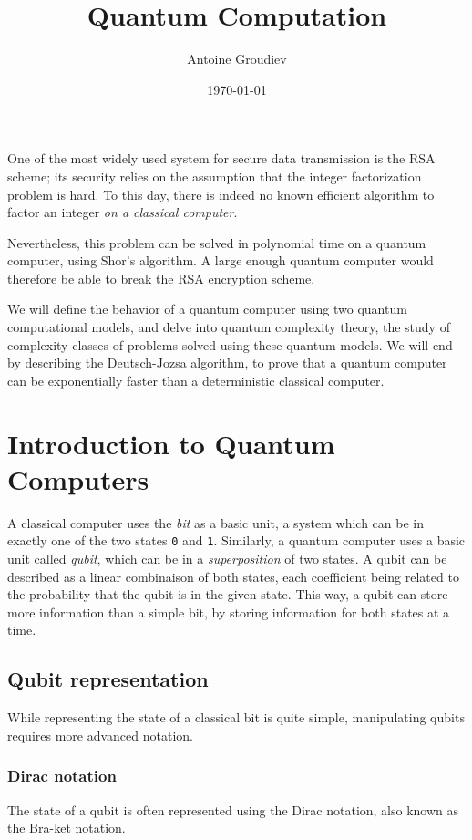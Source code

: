 \documentclass[12pt,a4paper]{article}
\title{\vspace{-3ex} \textbf{Quantum Computation}}
\author{Antoine Groudiev}
\date{\vspace{-1ex}\today}
\begin{document}
\maketitle
One of the most widely used system for secure data transmission is the RSA scheme; its security relies on the assumption that the integer factorization problem is hard. To this day, there is indeed no known efficient algorithm to factor an integer \textit{on a classical computer}.

Nevertheless, this problem can be solved in polynomial time on a quantum computer, using Shor's algorithm. A large enough quantum computer would therefore be able to break the RSA encryption scheme.

We will define the behavior of a quantum computer using two quantum computational models, and delve into quantum complexity theory, the study of complexity classes of problems solved using these quantum models. We will end by describing the Deutsch-Jozsa algorithm, to prove that a quantum computer can be exponentially faster than a deterministic classical computer.

\tableofcontents

\section{Introduction to Quantum Computers}
A classical computer uses the \emph{bit} as a basic unit, a system which can be in exactly one of the two states \texttt{0} and \texttt{1}. Similarly, a quantum computer uses a basic unit called \emph{qubit}, which can be in a \emph{superposition} of two states. A qubit can be described as a linear combinaison of both states, each coefficient being related to the probability that the qubit is in the given state. This way, a qubit can store more information than a simple bit, by storing information for both states at a time.

\subsection{Qubit representation}
While representing the state of a classical bit is quite simple, manipulating qubits requires more advanced notation. 

\subsubsection{Dirac notation}
The state of a qubit is often represented using the Dirac notation, also known as the Bra-ket notation.%
\end{document}

